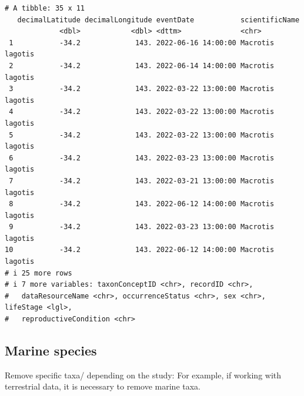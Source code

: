\documentclass[
  letterpaper,
  DIV=11,
  numbers=noendperiod,
  oneside]{scrreprt}
\begin{document}
\begin{verbatim}
# A tibble: 35 x 11
   decimalLatitude decimalLongitude eventDate           scientificName  
             <dbl>            <dbl> <dttm>              <chr>           
 1           -34.2             143. 2022-06-16 14:00:00 Macrotis lagotis
 2           -34.2             143. 2022-06-14 14:00:00 Macrotis lagotis
 3           -34.2             143. 2022-03-22 13:00:00 Macrotis lagotis
 4           -34.2             143. 2022-03-22 13:00:00 Macrotis lagotis
 5           -34.2             143. 2022-03-22 13:00:00 Macrotis lagotis
 6           -34.2             143. 2022-03-23 13:00:00 Macrotis lagotis
 7           -34.2             143. 2022-03-21 13:00:00 Macrotis lagotis
 8           -34.2             143. 2022-06-12 14:00:00 Macrotis lagotis
 9           -34.2             143. 2022-03-23 13:00:00 Macrotis lagotis
10           -34.2             143. 2022-06-12 14:00:00 Macrotis lagotis
# i 25 more rows
# i 7 more variables: taxonConceptID <chr>, recordID <chr>,
#   dataResourceName <chr>, occurrenceStatus <chr>, sex <chr>, lifeStage <lgl>,
#   reproductiveCondition <chr>
\end{verbatim}

\hypertarget{marine-species}{%
\subsection{Marine species}\label{marine-species}}

Remove specific taxa/ depending on the study: For example, if working
with terrestrial data, it is necessary to remove marine taxa.
\end{document}
